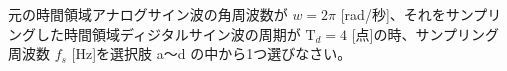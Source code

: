 元の時間領域アナログサイン波の角周波数が $w = 2\pi$ [rad/秒]、それをサンプリングした時間領域ディジタルサイン波の周期が $\textrm{T}_d = 4$ [点]の時、サンプリング周波数 $f_s$ [Hz]を選択肢 a〜d の中から1つ選びなさい。
